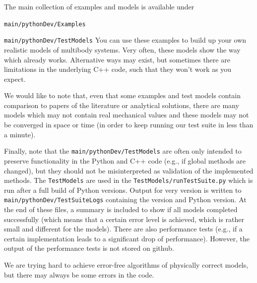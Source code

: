 
The main collection of examples and models is available under
\bi
  \item \texttt{main/pythonDev/Examples}
  \item \texttt{main/pythonDev/TestModels}
\ei
You can use these examples to build up your own realistic models of multibody systems.
Very often, these models show the way which already works. Alternative ways may exist, but
sometimes there are limitations in the underlying C++ code, such that they won't work as you expect.

We would like to note that, even that some examples and test models contain comparison to 
papers of the literature or analytical solutions, there are many models which may not contain real
mechanical values and these models may not be converged in space or time 
(in order to keep running our test suite in less than a minute).

Finally, note that the \texttt{main/pythonDev/TestModels} are often only intended to preserve functionality
in the Python and C++ code (e.g., if global methods are changed), but they should not be misinterpreted as validation of the 
implemented methods. The \texttt{TestModels} are used in the \codeName {} \texttt{TestModels/runTestSuite.py}
which is run after a full build of Python versions. Output for very version is written
to \texttt{main/pythonDev/TestSuiteLogs} containing the \codeName version and Python version. At the end of these
files, a summary is included to show if all models completed successfully (which means that a certain error level is achieved, which is rather small and different for the models).
There are also performance tests (e.g., if a certain implementation leads to a significant drop of performance).
However, the output of the performance tests is not stored on github.

We are trying hard to achieve error-free algorithms of physically correct models, but there may always be some errors in the code.

